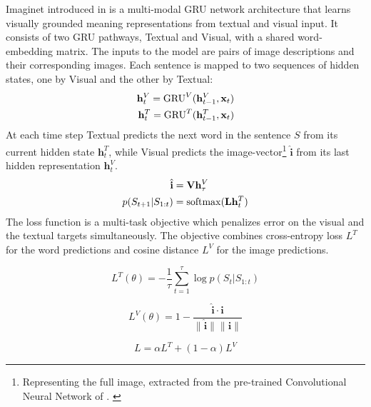 {\sc Imaginet} introduced in  is a
multi-modal GRU network architecture that learns visually grounded
meaning representations from textual and visual input. It consists of
two GRU pathways, {\sc Textual} and {\sc Visual}, with a shared
word-embedding matrix. The inputs to the model are pairs of image descriptions 
and their corresponding images. Each sentence is mapped to two
sequences of hidden states, one by {\sc Visual} and the other by {\sc
  Textual}:
\vspace{-.2cm}
\begin{align}
  \mathbf{h}^{V}_t = \mathrm{GRU}^V(\mathbf{h}^{V}_{t-1},\mathbf{x}_t)\\
  \mathbf{h}^{T}_t = \mathrm{GRU}^T(\mathbf{h}^{T}_{t-1},\mathbf{x}_t)
\vspace{-.1cm}
\end{align}
%
At each time step {\sc Textual} predicts the next word in the sentence
$S$ from its current hidden state $\mathbf{h}^{T}_t$, while {\sc
  Visual} predicts the image-vector\footnote{Representing the full image, 
  extracted from the pre-trained Convolutional Neural Network of 
  . \label{edit:dumdumeddy}}
$\hat{\mathbf{i}}$ from its last
hidden representation $\mathbf{h}^{V}_t$.
%
\vspace{-.2cm}
\begin{align}
   \hat{\mathbf{i}} &= \mathbf{V} \mathbf{h}^{V}_\tau \\
    p(S_{t+1}|S_{1:t}) &= \mathrm{softmax}(\mathbf{L}\mathbf{h}^T_t)
\vspace{-.1cm}
\end{align}
%
The loss function is a multi-task objective which penalizes error on
the visual and the textual targets simultaneously. The objective
combines cross-entropy loss $L^{T}$ for the word predictions
and cosine distance $L^V$ for the image
predictions.
%
\vspace{-.2cm}

\begin{equation}
\label{eq:lossce}
 L^{T}(\theta) = {-} \frac{1}{\tau}\sum_{t=1}^\tau \log p(S_t|S_{1:t})
\end{equation}

\begin{equation}
\label{eq:losscos}
 L^V(\theta) =  1 - \frac{\hat{\mathbf{i}} \cdot \mathbf{i}}{\|
     \hat{\mathbf{i}} \| \| \mathbf{i} \|}
\end{equation}

\begin{equation}
\label{eq:losscombo}
     L = \alpha L^T + (1-\alpha)L^{V}
\end{equation}
%

